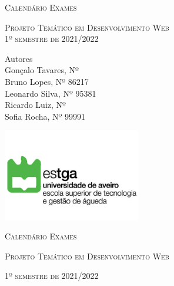 \documentclass[11pt, twoside]{report}
\begin{document}
	
\onehalfspacing%

	
	
	\begin{titlepage}
		\centering
		\scshape\Huge Calendário Exames\par
		\vspace{0.9cm}
		
		\scshape\large Projeto Temático em Desenvolvimento Web \\
		\vspace{0.3cm}
		\scshape\large 1º semestre de 2021/2022\par
		\vspace{0.4cm}
		\centering
		
		\vspace{1cm}
		
		\large
		Autores\\
		Gonçalo Tavares, Nº   \\
		Bruno Lopes, Nº 86217 \\
		Leonardo Silva, Nº 95381 \\
		Ricardo Luiz, Nº  \\
		Sofia Rocha, Nº 99991 \\
		
		\vspace{1cm}
		
		\centering
		\includegraphics[width=6cm]{logoestga}
		
		\newpage
		\thispagestyle{plain}%
		\thispagestyle{empty}%
		\centering
		\scshape\Huge Calendário Exames \par
		\vspace{1cm}
		
		\scshape\large Projeto Temático em Desenvolvimento Web\par
		\vspace{1cm}
		\scshape\large 1º semestre de 2021/2022\par
		\vspace{4cm}
		

\end{titlepage}
\end{document}
